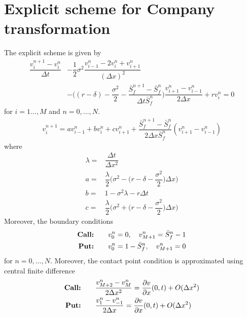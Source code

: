 
\section{Explicit scheme for Company transformation} \label{sec:company_explicit_scheme}
The explicit scheme is given by
\begin{equation*}
    \begin{split}
      \dfrac{v^{n+1}_{i} - v^{n}_{i}}{\Delta{t}} & - \dfrac{1}{2}\sigma^2 \dfrac{v^{n}_{i-1} - 2v^{n}_{i} + v^{n}_{i+1}}{(\Delta{x})^2} \\ 
       & - \bigg( (r-\delta) - \dfrac{\sigma^2}{2} - \dfrac{\bar{S}^{n+1}_{f} - \bar{S}^{n}_{f}}{\Delta{t}\bar{S}^{n}_{f}} \bigg)\dfrac{v^{n}_{i+1} - v^{n}_{i-1}}{2\Delta{x}} + rv^{n}_{i} = 0
    \end{split}
\end{equation*}
for $i=1\dots,M$ and $n = 0,\dots,N$. 
\begin{equation*}
    \begin{split}
        v^{n+1}_{i} = av^{n}_{i-1} + bv^{n}_{i} + cv^{n}_{i+1} + \dfrac{\bar{S}^{n+1}_{f} - \bar{S}^{n}_{f}}{2\Delta{x}\bar{S}^{n}_{f}}(v^{n}_{i+1} - v^{n}_{i-1})
    \end{split}
\end{equation*}
where 
\begin{equation*}
    \begin{split}
        \lambda =& \dfrac{\Delta{t}}{\Delta{x}^2}\\
        a =& \dfrac{\lambda}{2}\bigg( \sigma^2 - \bigg(r - \delta - \dfrac{\sigma^2}{2}\bigg)\Delta{x} \bigg) \\
        b =& 1 - \sigma^2\lambda- r\Delta{t} \\
        c =& \dfrac{\lambda}{2}\bigg(\sigma^2 + \bigg(r - \delta - \dfrac{\sigma^2}{2}\bigg)\Delta{x}\bigg)
    \end{split}
\end{equation*}
Moreover, the boundary conditions 
\begin{equation*}
    \begin{split}
        \text{\textbf{Call:}} \qquad & v^{n}_{0} = 0, \quad v^{n}_{M+1} = \bar{S}^{n}_{f} - 1 \\
        \text{\textbf{Put:}} \qquad & v^{n}_{0} = 1 - \bar{S}^{n}_{f}, \quad v^{n}_{M+1} = 0 \\
    \end{split}
\end{equation*}
for $n=0,\dots,N$. Moreover, the contact point condition is approximated using central finite difference
\begin{align*}
    \text{\textbf{Call:}} \qquad & \dfrac{v^{n}_{M+2} - v^{n}_{M}}{2\Delta{x}^2} = \dfrac{\partial{v}}{\partial{x}}(0, t) + O(\Delta{x}^2) \\
    \text{\textbf{Put:}} \qquad & \dfrac{v^{n}_{1} - v^{n}_{-1}}{2\Delta{x}} = \dfrac{\partial{v}}{\partial{x}}(0, t)+ O(\Delta{x}^2) 
\end{align*}


